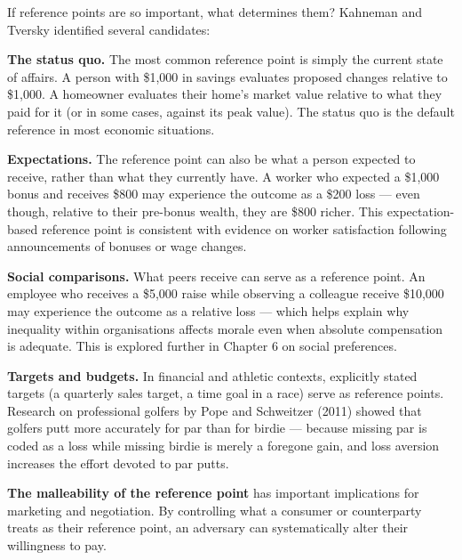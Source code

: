 \documentclass[12pt, letterpaper]{article}
\begin{document}
If reference points are so important, what determines them? Kahneman and Tversky identified several candidates:

\textbf{The status quo.} The most common reference point is simply the current state of affairs. A person with \$1,000 in savings evaluates proposed changes relative to \$1,000. A homeowner evaluates their home's market value relative to what they paid for it (or in some cases, against its peak value). The status quo is the default reference in most economic situations.

\textbf{Expectations.} The reference point can also be what a person expected to receive, rather than what they currently have. A worker who expected a \$1,000 bonus and receives \$800 may experience the outcome as a \$200 loss --- even though, relative to their pre-bonus wealth, they are \$800 richer. This expectation-based reference point is consistent with evidence on worker satisfaction following announcements of bonuses or wage changes.

\textbf{Social comparisons.} What peers receive can serve as a reference point. An employee who receives a \$5,000 raise while observing a colleague receive \$10,000 may experience the outcome as a relative loss --- which helps explain why inequality within organisations affects morale even when absolute compensation is adequate. This is explored further in Chapter 6 on social preferences.

\textbf{Targets and budgets.} In financial and athletic contexts, explicitly stated targets (a quarterly sales target, a time goal in a race) serve as reference points. Research on professional golfers by Pope and Schweitzer (2011) showed that golfers putt more accurately for par than for birdie --- because missing par is coded as a loss while missing birdie is merely a foregone gain, and loss aversion increases the effort devoted to par putts.

\textbf{The malleability of the reference point} has important implications for marketing and negotiation. By controlling what a consumer or counterparty treats as their reference point, an adversary can systematically alter their willingness to pay.
\end{document}
